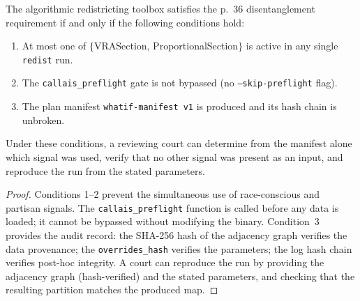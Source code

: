 \begin{proposition}
\label{prop:callais}
The algorithmic redistricting toolbox satisfies the \callais{} p.~36
disentanglement requirement if and only if the following conditions hold:
\begin{enumerate}
  \item At most one of $\{$VRASection, ProportionalSection$\}$ is active in
    any single \texttt{redist} run.
  \item The \texttt{callais\_preflight} gate is not bypassed (no
    \texttt{--skip-preflight} flag).
  \item The plan manifest \texttt{whatif-manifest v1} is produced and its
    hash chain is unbroken.
\end{enumerate}
Under these conditions, a reviewing court can determine from the manifest alone
which signal was used, verify that no other signal was present as an input,
and reproduce the run from the stated parameters.
\end{proposition}

\begin{proof}
Conditions 1--2 prevent the simultaneous use of race-conscious and partisan
signals.
The \texttt{callais\_preflight} function is called before any data is loaded;
it cannot be bypassed without modifying the binary.
Condition~3 provides the audit record: the SHA-256 hash of the adjacency graph
verifies the data provenance; the \texttt{overrides\_hash} verifies the
parameters; the log hash chain verifies post-hoc integrity.
A court can reproduce the run by providing the adjacency graph (hash-verified)
and the stated parameters, and checking that the resulting partition matches
the produced map.
\end{proof}
